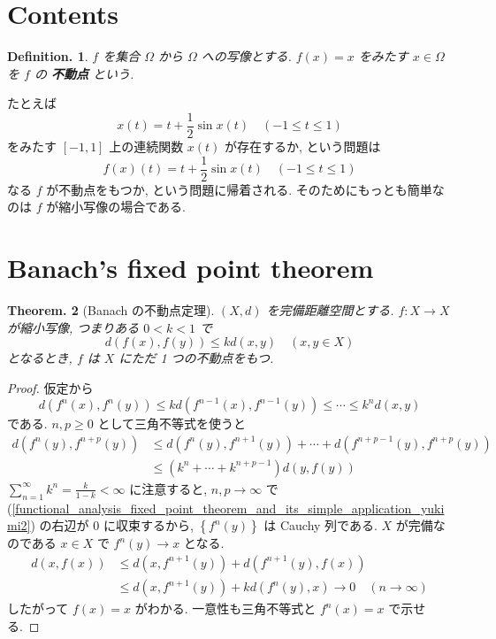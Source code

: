\documentclass[openany, a4paper, oneside]{jsbook}
\theoremstyle{break}
\newtheorem{thm}{Theorem.}[section]
\theoremstyle{breakdefn}
\newtheorem{defn}[thm]{Definition.}
\newcommand{\rbk}[1]{\left (#1\right)}
\newcommand{\cbk}[1]{\left\{#1\right\}}
\begin{document}
\section{Contents}


\begin{defn}
 $f$ を集合 $\Omega$ から $\Omega$ への写像とする.
 $f (x)=x$ をみたす $x \in \Omega$ を $f$ の \textbf{不動点} という.
\end{defn}

たとえば
\begin{equation}
 x (t)
 =
 t + \frac{1}{2} \sin x (t) \quad (-1 \le t \le 1)
\end{equation}
をみたす $[-1, 1]$ 上の連続関数  $x (t)$  が存在するか, という問題は
\begin{equation}
 f (x) (t)
 =
 t + \frac{1}{2} \sin x (t) \quad  (-1 \le t \le 1)
\end{equation}
なる $f$ が不動点をもつか, という問題に帰着される.
そのためにもっとも簡単なのは $f$ が縮小写像の場合である.
\section{Banach's fixed point theorem}


\begin{thm}[Banach の不動点定理]
 $(X, d)$ を完備距離空間とする.
 $f \colon X \to X$ が縮小写像, つまりある $0 < k <1$ で
 \begin{equation}
  d (f (x), f (y))
  \le
  kd (x, y) \quad  (x, y \in X)
 \end{equation}
 となるとき, $f$ は $X$ にただ 1 つの不動点をもつ.
\end{thm}
\begin{proof}
仮定から
\begin{equation}
 d (f^n (x), f^n (y))
 \le
 kd \rbk{f^{n-1}(x), f^{n-1}(y)}
 \le
 \cdots
 \le
 k^nd (x, y)
\end{equation}
である.
$n, p \ge 0$ として三角不等式を使うと
\begin{align}\label{functional_analysis_fixed_point_theorem_and_its_simple_application_yukimi2}
 d (f^n (y), f^{n+p}(y))
 &\le d (f^n (y), f^{n+1}(y)) + \cdots
  +d (f^{n+p-1}(y), f^{n+p}(y))  \\
 &\le
 \rbk{k^n + \cdots + k^{n+p-1}} d (y, f (y))
\end{align}
$\sum_{n=1}^{\infty} k^n = \frac{k}{1-k} < \infty$ に注意すると,
$n, p \to \infty$ で (\ref{functional_analysis_fixed_point_theorem_and_its_simple_application_yukimi2}) の右辺が $0$ に収束するから,
$\cbk{f^n (y)}$ は Cauchy 列である.
$X$ が完備なのである $x \in X$ で $f^n (y) \to x$ となる.
\begin{align}
 d(x, f (x))
 &\le
 d (x, f^{n+1}(y)) + d (f^{n+1}(y), f (x))  \\
 &\le
 d (x, f^{n+1}(y)) + kd (f^n (y), x) \to 0 \quad \rbk{n \to \infty}
\end{align}
したがって $f (x) = x$ がわかる.
一意性も三角不等式と $f^n (x) = x$ で示せる.
\end{proof}
\end{document}
